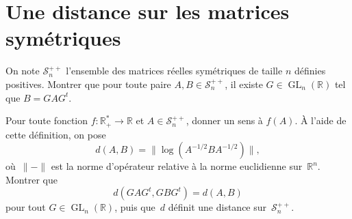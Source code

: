 \section{Une distance sur les matrices symétriques}

On note $\mathcal{S}^{++}_n$ l'ensemble des matrices réelles symétriques de taille $n$ définies positives.
Montrer que pour toute paire $A,B\in \mathcal{S}^{++}_n$, il existe $G\in \operatorname{GL}_n(\mathbb{R})$ tel que $B=GAG^t$.

Pour toute fonction $f:\mathbb{R}_+^*\to \mathbb{R}$ et $A\in \mathcal{S}^{++}_n$, donner un sens à $f(A)$. À l'aide de cette définition, on pose
\[d(A,B)=\| \log (A^{-1/2}BA^{-1/2}) \|,\]
où~$\|-\|$ est la norme d'opérateur relative à la norme euclidienne sur~$\mathbb{R}^n$.
Montrer que
\[ d(GAG^t,GBG^t)=d(A,B) \]
pour tout $G\in \operatorname{GL}_n(\mathbb{R})$, puis que~$d$ définit une distance sur~$\mathcal{S}^{++}_n$.

